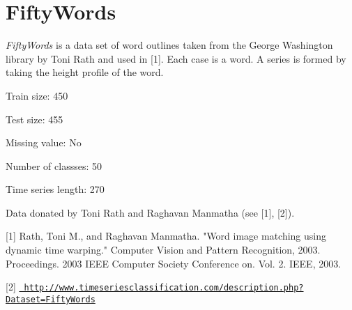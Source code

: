\chapter{Fifty\+Words}
\hypertarget{md_external_2data_2UCRArchive__2018_2FiftyWords_2README}{}\label{md_external_2data_2UCRArchive__2018_2FiftyWords_2README}
\label{md_external_2data_2UCRArchive__2018_2FiftyWords_2README_autotoc_md72}%
%
 {\itshape Fifty\+Words} is a data set of word outlines taken from the George Washington library by Toni Rath and used in \mbox{[}1\mbox{]}. Each case is a word. A series is formed by taking the height profile of the word.

Train size\+: 450

Test size\+: 455

Missing value\+: No

Number of classses\+: 50

Time series length\+: 270

Data donated by Toni Rath and Raghavan Manmatha (see \mbox{[}1\mbox{]}, \mbox{[}2\mbox{]}).

\mbox{[}1\mbox{]} Rath, Toni M., and Raghavan Manmatha. "{}\+Word image matching using dynamic time warping."{} Computer Vision and Pattern Recognition, 2003. Proceedings. 2003 IEEE Computer Society Conference on. Vol. 2. IEEE, 2003.

\mbox{[}2\mbox{]} \href{http://www.timeseriesclassification.com/description.php?Dataset=FiftyWords}{\texttt{ http\+://www.\+timeseriesclassification.\+com/description.\+php?\+Dataset=\+Fifty\+Words}} 